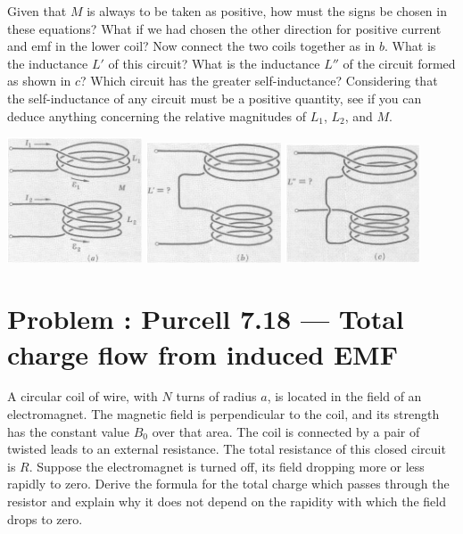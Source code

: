 \documentclass[problems]{esg8022pset}
\begin{document}
  Given that $M$ is always to be taken as positive, how must the signs be chosen in these equations? What if we had chosen the other direction for positive current and emf in the lower coil? Now connect the two coils together as in $b$. What is the inductance $L'$ of this circuit? What is the inductance $L''$ of the circuit formed as shown in $c$? Which circuit has the greater self-inductance? Considering that the self-inductance of any circuit must be a positive quantity, see if you can deduce anything concerning the relative magnitudes of $L_1$, $L_2$, and $M$.

  \begin{center}
    \includegraphics[width = 0.3\textwidth]{pu711a}
    \includegraphics[width = 0.3\textwidth]{pu711b}
    \includegraphics[width = 0.3\textwidth]{pu711c}
  \end{center}
\section{Problem \thesection: Purcell 7.18 --- Total charge flow from induced EMF}
  A circular coil of wire, with $N$ turns of radius $a$, is located in the field of an electromagnet.
  The magnetic field is perpendicular to the coil, and its strength has the constant value $B_{0}$ over that area.
  The coil is connected by a pair of twisted leads to an external resistance. The total resistance of this closed
  circuit is $R$. Suppose the electromagnet is turned off, its field dropping more or less rapidly to zero. Derive
  the formula for the total charge which passes through the resistor and explain why it does not depend on the rapidity
  with which the field drops to zero.
\end{document}
